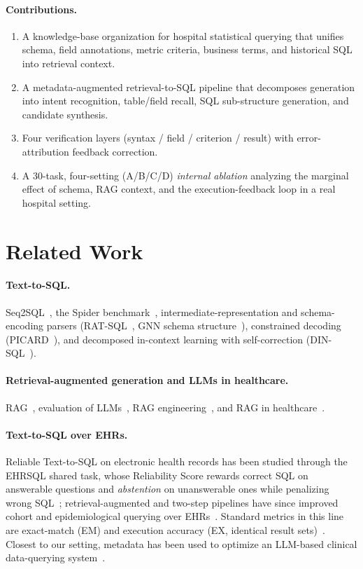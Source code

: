 \documentclass[11pt]{article}
\begin{document}
\paragraph{Contributions.}
\begin{enumerate}
  \item A knowledge-base organization for hospital statistical querying that unifies schema, field
  annotations, metric criteria, business terms, and historical SQL into retrieval context.
  \item A metadata-augmented retrieval-to-SQL pipeline that decomposes generation into intent
  recognition, table/field recall, SQL sub-structure generation, and candidate synthesis.
  \item Four verification layers (syntax / field / criterion / result) with error-attribution
  feedback correction.
  \item A 30-task, four-setting (A/B/C/D) \emph{internal ablation} analyzing the marginal effect of
  schema, RAG context, and the execution-feedback loop in a real hospital setting.
\end{enumerate}

\section{Related Work}
\paragraph{Text-to-SQL.} Seq2SQL~\cite{zhong2017}, the Spider benchmark~\cite{yu2018},
intermediate-representation and schema-encoding parsers (RAT-SQL~\cite{wang2020},
GNN schema structure~\cite{bogin2019}), constrained decoding (PICARD~\cite{scholak2021}), and
decomposed in-context learning with self-correction (DIN-SQL~\cite{pourreza2023}).
\paragraph{Retrieval-augmented generation and LLMs in healthcare.} RAG~\cite{lewis2020},
evaluation of LLMs~\cite{chang2024}, RAG engineering~\cite{finardi2024}, and RAG in
healthcare~\cite{ng2025}.
\paragraph{Text-to-SQL over EHRs.} Reliable Text-to-SQL on electronic health records has been
studied through the EHRSQL shared task, whose Reliability Score rewards correct SQL on answerable
questions and \emph{abstention} on unanswerable ones while penalizing wrong SQL~\cite{ehrsql2024};
retrieval-augmented and two-step pipelines have since improved cohort and epidemiological querying
over EHRs~\cite{rag2step2025,ragepi2024}. Standard metrics in this line are exact-match (EM) and
execution accuracy (EX, identical result sets)~\cite{yu2018}. Closest to our setting, metadata has
been used to optimize an LLM-based clinical data-querying system~\cite{metaclin2025}.
\end{document}
